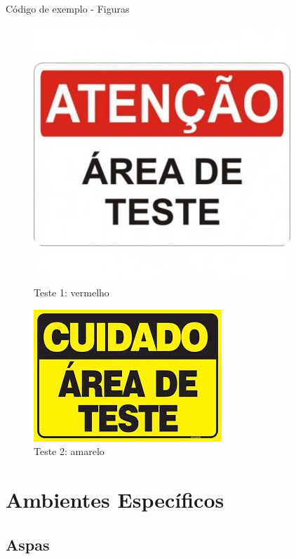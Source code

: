 \documentclass[a4paper,12pt,oneside]{memoir}
\begin{document}
\begin{codex}{Código de exemplo - Figuras}
\begin{figure}[h!]
\begin{center}
\includegraphics[scale=0.5]{img/teste1.jpeg}
\caption{Teste 1: vermelho}
\label{fig:vermelho}
\end{center}
\end{figure}
\begin{figure}[h!]
\begin{center}
\includegraphics[scale=0.5]{img/teste2.jpeg}
\caption{Teste 2: amarelo}
\label{fig:amarelo}
\end{center}
\end{figure}
\end{codex}
\chapter{Ambientes Específicos}

\section{Aspas}
\end{document}
